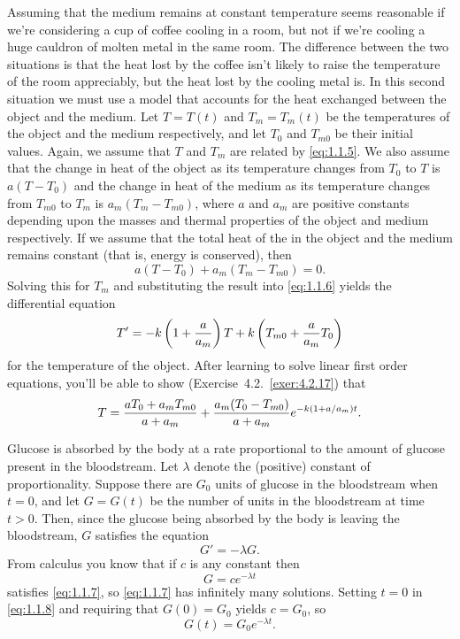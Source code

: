 \documentclass{ximera}
\begin{document}
Assuming that the medium remains at constant temperature seems
reasonable if we're considering a cup of coffee cooling in a room, but
 not if we're cooling a huge cauldron of molten
metal in the same room. The difference between the two situations is
that the heat lost by the coffee isn't likely to raise the
temperature of the room appreciably, but the heat lost by the
cooling metal is. In this second situation we must use a model that
accounts for the heat exchanged between the object and the medium. Let
$T=T(t)$ and $T_m=T_m(t)$ be the temperatures of the object and the
medium respectively, and let $T_0$ and $T_{m0}$ be their initial
values. Again, we assume that $T$ and $T_m$ are related by
\eqref{eq:1.1.5}. We also assume that the change in heat of
the object as its temperature changes from $T_0$ to $T$ is $a(T-T_0)$
and  the change in heat of the medium as its temperature changes
from $T_{m0}$ to $T_m$ is $a_m(T_m-T_{m0})$, where $a$ and $a_m$ are
positive constants depending upon the masses and thermal properties of
the object and medium respectively. If we assume that the total heat
of the in the object and the medium remains constant
(that is, energy is conserved), then
$$
a(T-T_0)+a_m(T_m-T_{m0})=0.
$$
Solving this for  $T_m$  and substituting the result into
\eqref{eq:1.1.6} yields the differential equation
$$
T'=-k\left(1+{a\over a_m}\right)T
+k\left(T_{m0}+{a\over a_m}T_0\right)
$$
for the temperature of the object.  After learning to solve linear
first order  equations, you'll be able to show
(Exercise~4.2.~\hspace*{-3pt}\ref{exer:4.2.17}) that
$$
T={aT_0+a_mT_{m0}\over
a+a_m}+{a_m(T_0-T_{m0})\over a+a_m}e^{-k(1+a/a_m)t}.
$$


\noindent
Glucose is absorbed by
the body at a rate proportional to the amount of glucose present in
the bloodstream. Let $\lambda$ denote the (positive) constant of
proportionality. Suppose   there are $G_0$ units of glucose in
the bloodstream when $t=0$, and let $G=G(t)$ be the number of units in
the bloodstream at time $t>0$. Then, since the glucose being absorbed
by the body is leaving the bloodstream, $G$ satisfies the equation
\begin{equation} \label{eq:1.1.7}
G'=-\lambda G.
\end{equation}
From  calculus you know that if $c$ is any constant then
\begin{equation} \label{eq:1.1.8}
G=ce^{-\lambda t}
\end{equation}
satisfies \eqref{eq:1.1.7}, so \eqref{eq:1.1.7} has infinitely
many solutions.
 Setting $t=0$ in \eqref{eq:1.1.8} and requiring that
$G(0)=G_0$ yields $c=G_0$, so
$$
G(t)=G_0e^{-\lambda t}.
$$
\end{document}
